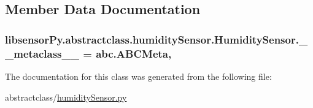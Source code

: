 \subsection{Member Data Documentation}
\hypertarget{classlibsensorPy_1_1abstractclass_1_1humiditySensor_1_1HumiditySensor_a434c9466733bb9326a79ff4ed6f18744}{}
\subsubsection[{\+\_\+\+\_\+metaclass\+\_\+\+\_\+}]{\setlength{\rightskip}{0pt plus 5cm}libsensor\+Py.\+abstractclass.\+humidity\+Sensor.\+Humidity\+Sensor.\+\_\+\+\_\+metaclass\+\_\+\+\_\+ = abc.\+A\+B\+C\+Meta\hspace{0.3cm}{\ttfamily [static]}, {\ttfamily [private]}}\label{classlibsensorPy_1_1abstractclass_1_1humiditySensor_1_1HumiditySensor_a434c9466733bb9326a79ff4ed6f18744}


The documentation for this class was generated from the following file\+:\begin{DoxyCompactItemize}
\item 
abstractclass/\hyperlink{abstractclass_2humiditySensor_8py}{humidity\+Sensor.\+py}\end{DoxyCompactItemize}
